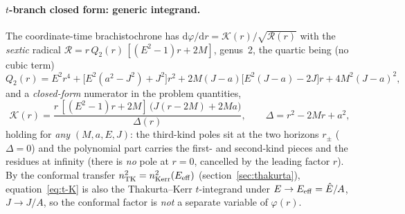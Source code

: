 \documentclass[12pt]{iopart}
\theoremstyle{plain}
\theoremstyle{definition}
\theoremstyle{remark}
\newcommand{\Ehat}{\hat E}
\newcommand{\dd}{\mathrm{d}}
\begin{document}
\paragraph{$t$-branch closed form: generic integrand.} The coordinate-time
brachistochrone has $\dd\varphi/\dd r=\mathcal K(r)/\sqrt{\mathcal R(r)}$ with the
\emph{sextic} radical $\mathcal R=r\,Q_2(r)\,[(E^2-1)r+2M]$, genus~2, the quartic
being (no cubic term)
\begin{equation}
    Q_2(r)=E^2r^4+\big[E^2(a^2-J^2)+J^2\big]r^2
      +2M(J-a)\big[E^2(J-a)-2J\big]r+4M^2(J-a)^2,
    \label{eq:t-Q2}
\end{equation}
and a \emph{closed-form} numerator in the problem quantities,
\begin{equation}
    \mathcal K(r)=\frac{r\,[(E^2-1)r+2M]\,\big(J(r-2M)+2Ma\big)}{\Delta(r)},
    \qquad \Delta=r^2-2Mr+a^2,
    \label{eq:t-K}
\end{equation}
holding for \emph{any} $(M,a,E,J)$: the third-kind poles sit at the two horizons
$r_\pm$ ($\Delta=0$) and the polynomial part carries the first- and second-kind
pieces and the residues at infinity (there is \emph{no} pole at $r=0$, cancelled by the leading factor $r$).
By the conformal transfer $n^2_{\rm TK}=n^2_{\rm Kerr}(E_{\rm eff})$
(section~\ref{sec:thakurta}), equation~\eqref{eq:t-K} is also the Thakurta--Kerr
$t$-integrand under $E\to E_{\rm eff}=\Ehat/A$, $J\to J/A$, so the conformal
factor is \emph{not} a separate variable of $\varphi(r)$.
\end{document}
